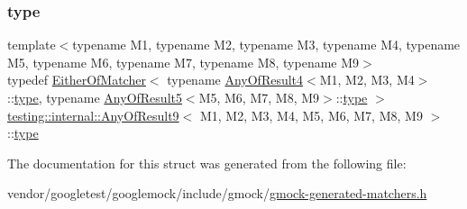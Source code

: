\subsubsection{\texorpdfstring{type}{type}}
{\footnotesize\ttfamily template$<$typename M1, typename M2, typename M3, typename M4, typename M5, typename M6, typename M7, typename M8, typename M9$>$ \\
typedef \hyperlink{classtesting_1_1internal_1_1_either_of_matcher}{Either\+Of\+Matcher}$<$ typename \hyperlink{structtesting_1_1internal_1_1_any_of_result4}{Any\+Of\+Result4}$<$M1, M2, M3, M4$>$\+::\hyperlink{structtesting_1_1internal_1_1_any_of_result9_a308935fb02c62f502044dcc7b0a2b464}{type}, typename \hyperlink{structtesting_1_1internal_1_1_any_of_result5}{Any\+Of\+Result5}$<$M5, M6, M7, M8, M9$>$\+::\hyperlink{structtesting_1_1internal_1_1_any_of_result9_a308935fb02c62f502044dcc7b0a2b464}{type} $>$ \hyperlink{structtesting_1_1internal_1_1_any_of_result9}{testing\+::internal\+::\+Any\+Of\+Result9}$<$ M1, M2, M3, M4, M5, M6, M7, M8, M9 $>$\+::\hyperlink{structtesting_1_1internal_1_1_any_of_result9_a308935fb02c62f502044dcc7b0a2b464}{type}}



The documentation for this struct was generated from the following file\+:\begin{DoxyCompactItemize}
\item 
vendor/googletest/googlemock/include/gmock/\hyperlink{gmock-generated-matchers_8h}{gmock-\/generated-\/matchers.\+h}\end{DoxyCompactItemize}

